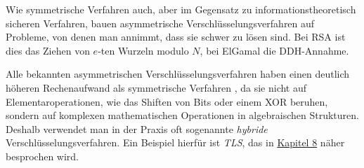 Wie symmetrische Verfahren auch, aber im Gegensatz zu
informationstheoretisch sicheren Verfahren, bauen asymmetrische
Verschlüsselungsverfahren auf Probleme, von denen man annimmt, dass sie
schwer zu lösen sind. Bei RSA ist dies das Ziehen von $e$-ten Wurzeln
modulo $N$, bei ElGamal die DDH-Annahme.

Alle bekannten asymmetrischen Verschlüsselungsverfahren haben einen
deutlich höheren Rechenaufwand als symmetrische Verfahren \indexEncryptionSymm, da sie nicht
auf Elementaroperationen, wie das Shiften von
Bits oder einem XOR beruhen, sondern auf komplexen mathematischen
Operationen in algebraischen Strukturen. Deshalb
verwendet man in der Praxis oft sogenannte \emph{hybride}
Verschlüsselungsverfahren. Ein Beispiel hierfür ist \emph{TLS}, das in
 \hyperref[cha:keyexchange]{Kapitel 8} näher besprochen wird.





